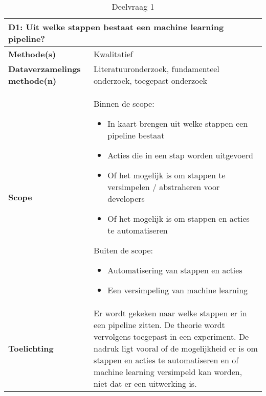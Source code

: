 {\begin{table}[hbt!]
\centering
\begin{tabular}{|p{.215\linewidth}|p{.72\linewidth}|}
\hline
\multicolumn{2}{|p{.97\linewidth}|}{\textbf{D1: Uit welke stappen bestaat een machine learning pipeline?}} \\ \hline
  \textbf{Methode(s)}&
    Kwalitatief
  \\ \hline
  \textbf{Dataverzamelings methode(n)}&
    Literatuuronderzoek, fundamenteel onderzoek, toegepast onderzoek
  \\ \hline
  \textbf{Scope}&
    Binnen de scope:
    \begin{itemize}
      \item In kaart brengen uit welke stappen een pipeline bestaat
      \item Acties die in een stap worden uitgevoerd
      \item Of het mogelijk is om stappen te versimpelen / abstraheren voor developers
      \item Of het mogelijk is om stappen en acties te automatiseren
    \end{itemize}
    Buiten de scope:
    \begin{itemize}
      \item Automatisering van stappen en acties
      \item Een versimpeling van machine learning
    \end{itemize}
  \\ \hline
  \textbf{Toelichting}&
    Er wordt gekeken naar welke stappen er in een pipeline zitten. De theorie wordt vervolgens toegepast in een experiment. De nadruk ligt vooral of de mogelijkheid er is om stappen en acties te automatiseren en of machine learning versimpeld kan worden, niet dat er een uitwerking is.
  \\ \hline
\end{tabular}
\caption{Deelvraag 1}
\label{table:sq1}
\end{table}

\space
\newpage

}
